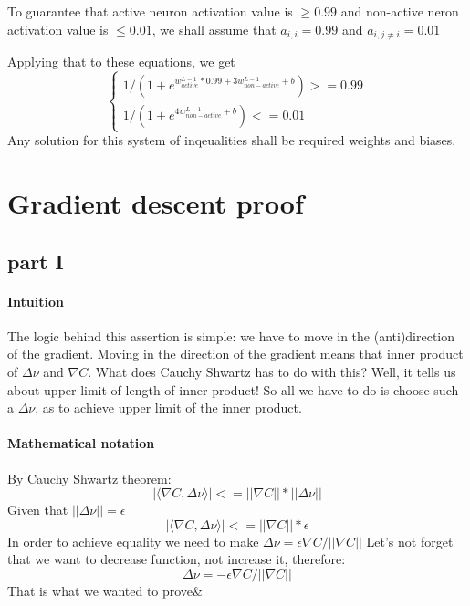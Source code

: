 \documentclass{article}
\begin{document}
To guarantee that active neuron activation value is $\geq 0.99$ and non-active neron activation value is $\leq 0.01$, we shall assume that $a_{i,i} = 0.99$ and $a_{i,j \neq i} = 0.01$

Applying that to these equations, we get
\[
\begin{cases}
1/(1 + e^{w_{active}^{L-1} * 0.99 + 3w_{non-active}^{L-1} + b}) >= 0.99\\
1/(1 + e^{4w_{non-active}^{L-1} + b}) <= 0.01
\end{cases}
\]
Any solution for this system of inqeualities shall be required weights and biases. 

\section{Gradient descent proof}
\subsection{part I}
\paragraph{Intuition}
The logic behind this assertion is simple: we have to move in the (anti)direction of the gradient.
Moving in the direction of the gradient means that inner product of ${\Delta}\nu$ and ${\nabla}C$.
What does Cauchy Shwartz has to do with this? 
Well, it tells us about  upper limit of length of inner product! 
So all we have to do is choose such a ${\Delta}\nu$, as to achieve upper limit of the inner product.
\paragraph{Mathematical notation}
By Cauchy Shwartz theorem:
$$|{\langle}{\nabla}C,{\Delta}\nu{\rangle}| <= ||{\nabla}C||*||{\Delta}\nu||$$
Given that $||{\Delta}\nu|| = \epsilon$
$$|{\langle}{\nabla}C,{\Delta}\nu{\rangle}| <= ||{\nabla}C||*\epsilon$$
In order to achieve equality we need to make ${\Delta}\nu = {\epsilon}{\nabla}C/||{\nabla}C||$
Let's not forget that we want to decrease function, not increase it, therefore:
$${\Delta}\nu = -{\epsilon}{\nabla}C/||{\nabla}C||$$
That is what we wanted to prove&
\end{document}
